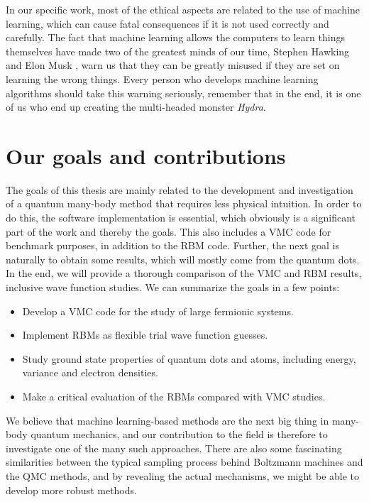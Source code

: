 In our specific work, most of the ethical aspects are related to the use of machine learning, which can cause fatal consequences if it is not used correctly and carefully. The fact that machine learning allows the computers to learn things themselves have made two of the greatest minds of our time, Stephen Hawking \supercite{cellan-jones_hawking:_2014} and Elon Musk \supercite{vance_elon_2015}, warn us that they can be greatly misused if they are set on learning the wrong things. Every person who develops machine learning algorithms should take this warning seriously, remember that in the end, it is one of us who end up creating the multi-headed monster \textit{Hydra}.

\section{Our goals and contributions} \label{sec:goals}
The goals of this thesis are mainly related to the development and investigation of a quantum many-body method that requires less physical intuition. In order to do this, the software implementation is essential, which obviously is a significant part of the work and thereby the goals. This also includes a VMC code for benchmark purposes, in addition to the RBM code. Further, the next goal is naturally to obtain some results, which will mostly come from the quantum dots. In the end, we will provide a thorough comparison of the VMC and RBM results, inclusive wave function studies. We can summarize the goals in a few points:
\begin{itemize}
	\item Develop a VMC code for the study of large fermionic systems.
	\item Implement RBMs as flexible trial wave function guesses.
	\item Study ground state properties of quantum dots and atoms, including energy, variance and electron densities.
	\item Make a critical evaluation of the RBMs compared with VMC studies.
\end{itemize}

We believe that machine learning-based methods are the next big thing in many-body quantum mechanics, and our contribution to the field is therefore to investigate one of the many such approaches. There are also some fascinating similarities between the typical sampling process behind Boltzmann machines and the QMC methods, and by revealing the actual mechanisms, we might be able to develop more robust methods. 

